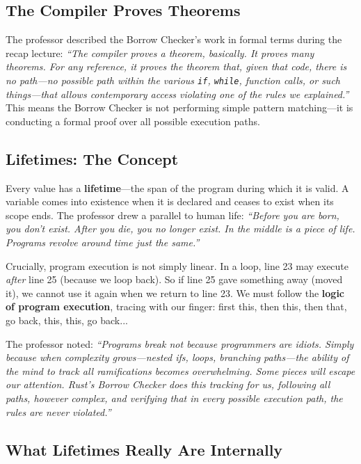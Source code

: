 \subsection{The Compiler Proves Theorems}

The professor described the Borrow Checker's work in formal terms during the recap lecture: \emph{``The compiler proves a theorem, basically. It proves many theorems. For any reference, it proves the theorem that, given that code, there is no path---no possible path within the various \texttt{if}, \texttt{while}, function calls, or such things---that allows contemporary access violating one of the rules we explained.''} This means the Borrow Checker is not performing simple pattern matching---it is conducting a formal proof over all possible execution paths.

\subsection{Lifetimes: The Concept}

Every value has a \textbf{lifetime}---the span of the program during which it is valid. A variable comes into existence when it is declared and ceases to exist when its scope ends. The professor drew a parallel to human life: \emph{``Before you are born, you don't exist. After you die, you no longer exist. In the middle is a piece of life. Programs revolve around time just the same.''}

Crucially, program execution is not simply linear. In a loop, line 23 may execute \emph{after} line 25 (because we loop back). So if line 25 gave something away (moved it), we cannot use it again when we return to line 23. We must follow the \textbf{logic of program execution}, tracing with our finger: first this, then this, then that, go back, this, this, go back...

The professor noted: \emph{``Programs break not because programmers are idiots. Simply because when complexity grows---nested ifs, loops, branching paths---the ability of the mind to track all ramifications becomes overwhelming. Some pieces will escape our attention. Rust's Borrow Checker does this tracking for us, following all paths, however complex, and verifying that in every possible execution path, the rules are never violated.''}

\subsection{What Lifetimes Really Are Internally}

